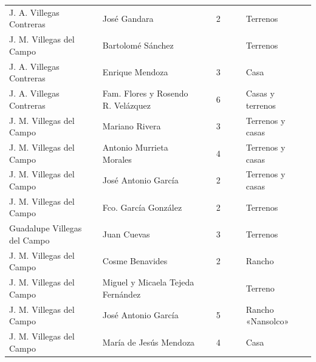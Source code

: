 \documentclass[14pt,twoside,final]{extbook} %
\begin{document}
{\begin{longtable}[c]{@{}p{2.5cm}lrSrrl@{}}
J. A. Villegas Contreras & José Gandara &  & 2 &  &  & Terrenos \\
J. M. Villegas del Campo & Bartolomé Sánchez &  & {} &  &  & Terrenos \\
J. A. Villegas Contreras & Enrique Mendoza &  & 3 &  &  & Casa \\
J. A. Villegas Contreras & Fam. Flores y Rosendo R. Velázquez &  & 6 &  &  & Casas y terrenos \\
J. M. Villegas del Campo & Mariano Rivera &  & 3 &  &  & Terrenos y casas \\
J. M. Villegas del Campo & Antonio Murrieta Morales &  & 4 &  &  & Terrenos y casas \\
J. M. Villegas del Campo & José Antonio García &  & 2 &  &  & Terrenos y casas \\
J. M. Villegas del Campo & Fco. García González &  & 2 &  &  & Terrenos \\
Guadalupe Villegas del Campo & Juan Cuevas &  & 3 & {} & {} & Terrenos \\
J. M. Villegas del Campo & Cosme Benavides &  & 2 &  &  & Rancho \\
J. M. Villegas del Campo & Miguel y Micaela Tejeda Fernández &  & {} & {} & {} & Terreno \\
J. M. Villegas del Campo & José Antonio García &  & 5 &  &  & Rancho «Nansolco» \\
J. M. Villegas del Campo & María de Jesús Mendoza &  & 4 &  &  & Casa \\

\end{longtable}}
\end{document}
